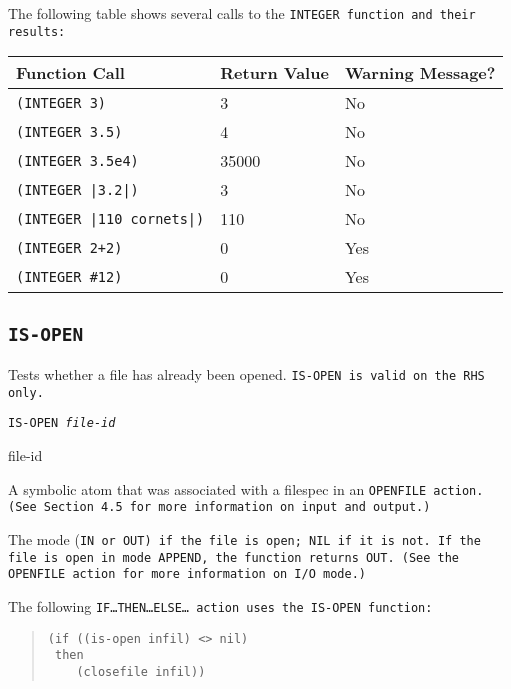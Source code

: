\Example

The following table shows several calls to the \tt{INTEGER}
function and their results:

\begin{center}
  \begin{tabular}{lll}
    \toprule
    Function Call & Return Value &  Warning Message? \\
    \midrule
    \verb|(INTEGER 3)| &  3 & No \\
    \verb|(INTEGER 3.5)| &  4  & No \\
    \verb|(INTEGER 3.5e4)| &  35000 & No \\
    \verb,(INTEGER |3.2|), &  3 & No \\
    \verb,(INTEGER |110 cornets|), & 110 & No \\
    \verb|(INTEGER 2+2)| &  0 & Yes \\
    \verb|(INTEGER #12)| &  0 & Yes \\
    \bottomrule
  \end{tabular}
\end{center}

\subsection{\tt{IS-OPEN}}

Tests whether a file has already been opened. \tt{IS-OPEN} is valid on
the RHS only.

\Format

\tt{IS-OPEN} \it{file-id}

\begin{arguments}
\item[file-id]

  A symbolic atom that was associated with a filespec in an
  \tt{OPENFILE} action. (See Section 4.5 for more information on input
  and output.)
\end{arguments}

\ReturnValue

The mode (\tt{IN} or \tt{OUT}) if the file is open; \tt{NIL} if it is
not.  If the file is open in mode \tt{APPEND}, the function returns
\tt{OUT}.  (See the \tt{OPENFILE} action for more information on I/O
mode.)

\Example

The following \tt{IF}\ldots\tt{THEN}\ldots\tt{ELSE}\ldots{} action
uses the \tt{IS-OPEN} function:

\begin{quote}
\begin{verbatim}
(if ((is-open infil) <> nil)
 then
    (closefile infil))
\end{verbatim}
\end{quote}

